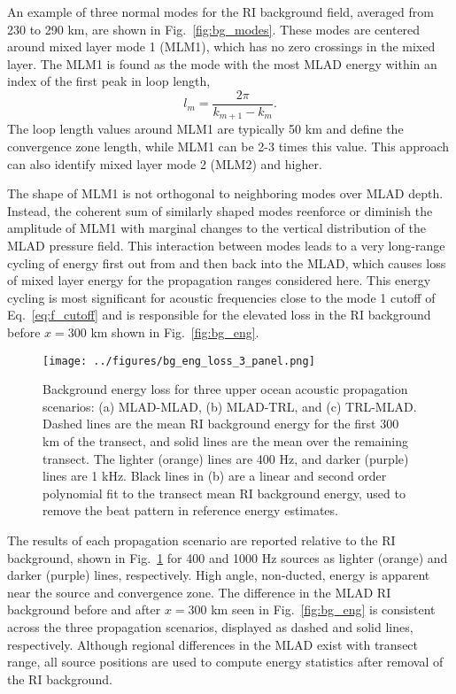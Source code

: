\documentclass[preprint,NumberedRefs]{JASA}
\begin{document}
An example of three normal modes for the RI background field, averaged from 230 to 290 km, are shown in Fig.~\ref{fig:bg_modes}. These modes are centered around mixed layer mode 1 (MLM1), which has no zero crossings in the mixed layer. The MLM1 is found as the mode with the most MLAD energy within an index of the first peak in loop length\citep{jensen2011computational},
\begin{equation}
    l_{m} = \frac{2 \pi}{k_{m+1} - k_m}.
    \label{eq:loop_length}
\end{equation}
The loop length values around MLM1 are typically 50 km and define the convergence zone length, while MLM1 can be 2-3 times this value. This approach can also identify mixed layer mode 2 (MLM2) and higher.

The shape of MLM1 is not orthogonal to neighboring modes over MLAD depth. Instead, the coherent sum of similarly shaped modes reenforce or diminish the amplitude of MLM1 with marginal changes to the vertical distribution of the MLAD pressure field. This interaction between modes leads to a very long-range cycling of energy first out from and then back into the MLAD\citep{porter93,colosi2020observations}, which causes loss of mixed layer energy for the propagation ranges considered here. This energy cycling is most significant for acoustic frequencies close to the mode 1 cutoff of Eq.~\eqref{eq:f_cutoff} and is responsible for the elevated loss in the RI background before $x=300$ km shown in Fig.~\ref{fig:bg_eng}.

\begin{figure}
\texttt{[image: ../figures/bg\_eng\_loss\_3\_panel.png]}
        \caption{Background energy loss for three upper ocean acoustic propagation scenarios: (a) MLAD-MLAD, (b) MLAD-TRL, and (c) TRL-MLAD. Dashed lines are the mean RI background energy for the first 300 km of the transect, and solid lines are the mean over the remaining transect. The lighter (orange) lines are 400 Hz, and darker (purple) lines are 1 kHz. Black lines in (b) are a linear and second order polynomial fit to the transect mean RI background energy, used to remove the beat pattern in reference energy estimates.}
    \label{fig:eng_bg_3}
\end{figure}

The results of each propagation scenario are reported relative to the RI background, shown in Fig.~\ref{fig:eng_bg_3} for 400 and 1000 Hz sources as lighter (orange) and darker (purple) lines, respectively. High angle, non-ducted, energy is apparent near the source and convergence zone. The difference in the MLAD RI background before and after $x=300$ km seen in Fig.~\ref{fig:bg_eng} is consistent across the three propagation scenarios, displayed as dashed and solid lines, respectively. Although regional differences in the MLAD exist with transect range, all source positions are used to compute energy statistics after removal of the RI background.
\end{document}

